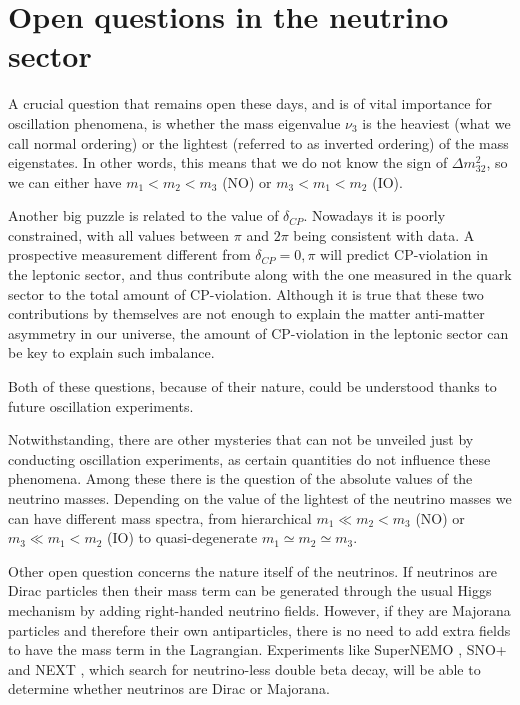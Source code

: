 \section{Open questions in the neutrino sector}\label{sec:nu_open_questions}

A crucial question that remains open these days, and is of vital importance for oscillation phenomena, is whether the mass eigenvalue $\nu_{3}$ is the heaviest (what we call normal ordering) or the lightest (referred to as inverted ordering) of the mass eigenstates. In other words, this means that we do not know the sign of $\Delta m^{2}_{32}$, so we can either have $m_{1}<m_{2}<m_{3}$ (NO) or $m_{3}<m_{1}<m_{2}$ (IO).

Another big puzzle is related to the value of $\delta_{CP}$. Nowadays it is poorly constrained, with all values between $\pi$ and $2\pi$ being consistent with data. A prospective measurement different from $\delta_{CP}=0,\pi$ will predict CP-violation in the leptonic sector, and thus contribute along with the one measured in the quark sector to the total amount of CP-violation. Although it is true that these two contributions by themselves are not enough to explain the matter anti-matter asymmetry in our universe, the amount of CP-violation in the leptonic sector can be key to explain such imbalance.

Both of these questions, because of their nature, could be understood thanks to future oscillation experiments.

Notwithstanding, there are other mysteries that can not be unveiled just by conducting oscillation experiments, as certain quantities do not influence these phenomena. Among these there is the question of the absolute values of the neutrino masses. Depending on the value of the lightest of the neutrino masses we can have different mass spectra, from hierarchical $m_{1} \ll m_{2}<m_{3}$ (NO) or $m_{3} \ll m_{1}<m_{2}$ (IO) to quasi-degenerate $m_{1} \simeq m_{2} \simeq m_{3}$.

Other open question concerns the nature itself of the neutrinos. If neutrinos are Dirac particles then their mass term can be generated through the usual Higgs mechanism by adding right-handed neutrino fields. However, if they are Majorana particles and therefore their own antiparticles, there is no need to add extra fields to have the mass term in the Lagrangian. Experiments like SuperNEMO \cite{SuperNEMO2010}, SNO+ \cite{SNO2015} and NEXT \cite{NEXT2020}, which search for neutrino-less double beta decay, will be able to determine whether neutrinos are Dirac or Majorana.

